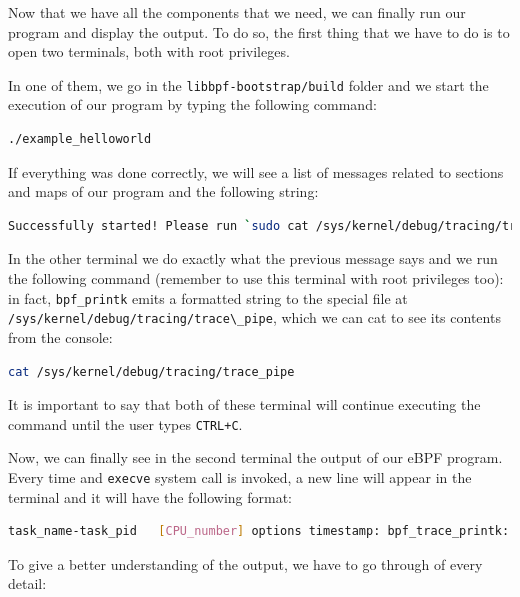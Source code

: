 Now that we have all the components that we need, we can finally run our program and display the output.
To do so, the first thing that we have to do is to open two terminals, both with root privileges.

In one of them, we go in the \verb|libbpf-bootstrap/build| folder and we start the execution of our program by typing the following command:

\begin{lstlisting}[language=bash, caption={libbpf-bootstrap program execution command}]
	./example_helloworld
\end{lstlisting}

If everything was done correctly, we will see a list of messages related to sections and maps of our program and the following string:

\begin{lstlisting}[language=bash, caption={libbpf-bootstrap program successful execution message}]
	Successfully started! Please run `sudo cat /sys/kernel/debug/tracing/trace_pipe` to see output of the BPF programs.
\end{lstlisting}

In the other terminal we do exactly what the previous message says and we run the following command (remember to use this terminal with root privileges too): in fact, \verb|bpf_printk| emits a formatted string to the special file at \verb|/sys/kernel/debug/tracing/trace\_pipe|, which we can cat to see its contents from the console:

\begin{lstlisting}[language=bash, caption={libbpf-bootstrap program successful execution message}]
	cat /sys/kernel/debug/tracing/trace_pipe
\end{lstlisting}

It is important to say that both of these terminal will continue executing the command until the user types \verb|CTRL+C|.

Now, we can finally see in the second terminal the output of our eBPF program.
Every time and \verb|execve| system call is invoked, a new line will appear in the terminal and it will have the following format:

\begin{lstlisting}[language=bash, caption={bpf\_printk output message}]
	task_name-task_pid   [CPU_number] options timestamp: bpf_trace_printk: invoke bpf_prog: Hello, World!
\end{lstlisting}

To give a better understanding of the output, we have to go through of every detail:

